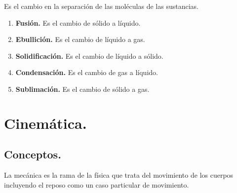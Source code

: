 \documentclass[14pt]{extarticle}
\begin{document}
Es el cambio en la separación de las moléculas de las sustancias.

\begin{enumerate}
\item \textbf{Fusión.} Es el cambio de sólido a líquido.
\item \textbf{Ebullición.} Es el cambio de líquido a gas.
\item \textbf{Solidificación.} Es el cambio de líquido a sólido.
\item \textbf{Condensación.} Es el cambio de gas a líquido.
\item \textbf{Sublimación.} Es el cambio de sólido a gas.
\end{enumerate}

\newpage

\section{Cinemática.}

\subsection{Conceptos.}

La mecánica es la rama de la física que trata del movimiento de los cuerpos incluyendo el reposo
como un caso particular de movimiento.
\end{document}
